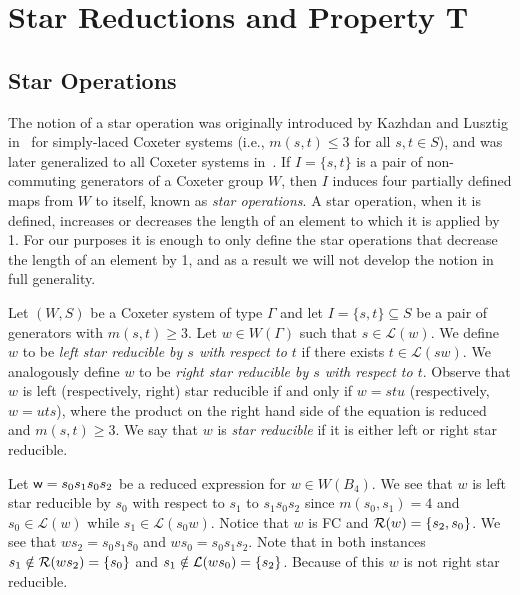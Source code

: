 \chapter{Star Reductions and Property T}


\section{Star Operations}\label{sec:star}

The notion of a star operation was originally introduced by Kazhdan and Lusztig in~\cite{Kazhdan1979} for simply-laced Coxeter systems (i.e., $m(s,t) \leq 3$ for all $s,t \in S$), and was later generalized to all Coxeter systems in~\cite{Lusztig1985}. If $I=\{s,t\}$ is a pair of non-commuting generators of a Coxeter group $W$, then $I$ induces four partially defined maps from $W$ to itself, known as \emph{star operations}. A star operation, when it is defined, increases or decreases the length of an element to which it is applied by 1. For our purposes it is enough to only define the star operations that decrease the length of an element by 1, and as a result we will not develop the notion in full generality.

Let $(W,S)$ be a Coxeter system of type $\Gamma$ and let $I=\{s,t\}\subseteq S$ be a pair of generators with $m(s,t) \geq 3$. Let $w \in W(\Gamma)$ such that $s \in \mathcal{L}(w)$. We define $w$ to be \emph{left star reducible by $s$ with respect to $t$} if there exists $t \in \mathcal{L}(sw)$. We analogously define $w$ to be \emph{right star reducible by $s$ with respect to $t$}. Observe that $w$ is left (respectively, right) star reducible if and only if $w=stu$ (respectively, $w=uts$), where the product on the right hand side of the equation is reduced and $m(s,t) \geq 3$. We say that $w$ is \emph{star reducible} if it is either left or right star reducible.

\begin{example}\label{ex:starred}
Let $\mathsf{w}=s_0s_1s_0s_2$ be a reduced expression for $w \in W(B_4)$. We see that $w$ is left star reducible by $s_0$ with respect to $s_1$ to $s_1s_0s_2$ since $m(s_0,s_1)=4$ and $s_0 \in \mathcal{L}(w)$ while $s_1 \in \mathcal{L}(s_0w)$. Notice that $w$ is FC and $\mathcal{R}(w)=\{s_2,s_0\}$. We see that $ws_2=s_0s_1s_0$ and $ws_0=s_0s_1s_2$. Note that in both instances $s_1 \notin \mathcal{R}(ws_2)=\{s_0\}$ and $s_1 \notin \mathcal{L}(ws_0)=\{s_2\}$. Because of this $w$ is not right star reducible. 
\end{example}

